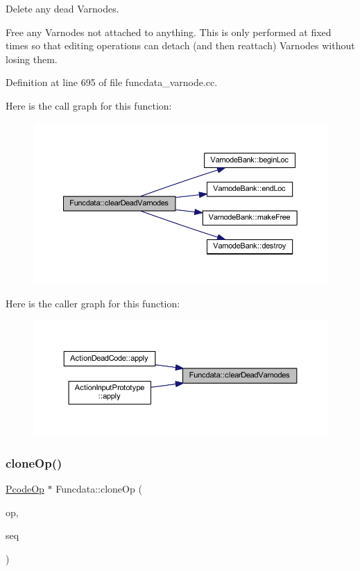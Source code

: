 Delete any dead Varnodes. 

Free any Varnodes not attached to anything. This is only performed at fixed times so that editing operations can detach (and then reattach) Varnodes without losing them. 

Definition at line 695 of file funcdata\+\_\+varnode.\+cc.

Here is the call graph for this function\+:
\nopagebreak
\begin{figure}[H]
\begin{center}
\leavevmode
\includegraphics[width=350pt]{class_funcdata_a4096b0e76e9015f9aa61fa56cb85d79c_cgraph}
\end{center}
\end{figure}
Here is the caller graph for this function\+:
\nopagebreak
\begin{figure}[H]
\begin{center}
\leavevmode
\includegraphics[width=350pt]{class_funcdata_a4096b0e76e9015f9aa61fa56cb85d79c_icgraph}
\end{center}
\end{figure}
\mbox{\label{class_funcdata_a1da8e9506c5b37fce86d165974a4cafb}} 
\subsubsection{\texorpdfstring{cloneOp()}{cloneOp()}}
{\footnotesize\ttfamily \mbox{\hyperlink{class_pcode_op}{Pcode\+Op}} $\ast$ Funcdata\+::clone\+Op (\begin{DoxyParamCaption}\item[{const \mbox{\hyperlink{class_pcode_op}{Pcode\+Op}} $\ast$}]{op,  }\item[{const \mbox{\hyperlink{class_seq_num}{Seq\+Num}} \&}]{seq }\end{DoxyParamCaption})}


